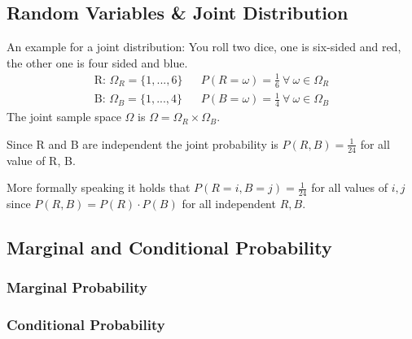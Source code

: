 \subsection{Random Variables \& Joint Distribution}
An example for a joint distribution: You roll two dice, one is six-sided and red, the other one is four sided and blue.
\begin{align*}
\mbox{R: }\Omega_R = \{1, ..., 6\} & & P(R=\omega) = \frac{1}{6}\ \forall\ \omega \in \Omega_R\\
\mbox{B: }\Omega_B = \{1, ..., 4\} & & P(B=\omega) = \frac{1}{4}\ \forall\ \omega \in \Omega_B
\end{align*}
The joint sample space $\Omega$ is $\Omega = \Omega_R \times \Omega_B$.

Since R and B are independent the joint probability is $ P(R, B) = \frac{1}{24}$ for all value of R, B.

More formally speaking it holds that $P(R=i, B=j) = \frac{1}{24}$ for all values of $i, j$ since $P(R, B) = P(R) \cdot P(B)$ for all independent $R, B$.
\subsection{Marginal and Conditional Probability}


\subsubsection*{Marginal Probability}


\subsubsection*{Conditional Probability}